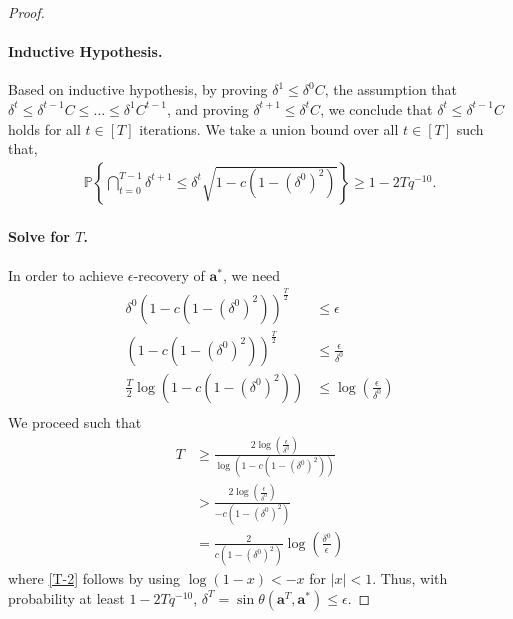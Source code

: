\documentclass{article}
\theoremstyle{plain}
\theoremstyle{definition}
\theoremstyle{remark}
\begin{document}
\begin{proof}
    
    
    \paragraph{Inductive Hypothesis.}
    Based on inductive hypothesis, by proving $\delta^{1}\leq \delta^{0} C$, the assumption that $\delta^{t}\leq \delta^{t-1} C\leq \dots \leq \delta^{1} C^{t-1}$, and proving $\delta^{t+1}\leq \delta^{t} C $, we conclude that $\delta^{t}\leq \delta^{t-1} C$ holds for all $t \in [T]$ iterations.
    We take a union bound over all $t \in [T]$ such that,
    \begin{align}
        \mathbb{P} \left\{\bigcap_{t=0}^{T-1} \delta^{t+1} \leq \delta^{t} \sqrt{1-c(1-(\delta^{0})^2)} \right\} \geq 1 - 2Tq^{-10}.  
    \end{align}
    \paragraph{Solve for $T$.}
    In order to achieve $\epsilon$-recovery of $\mathbf{a}^*$, we need
    \begin{align}
        \delta^{0} ({1-c(1-(\delta^{0})^2)})^{\frac{T}{2}} &\leq \epsilon \\
        ({1-c (1-(\delta^{0})^2)})^{\frac{T}{2}} &\leq \frac{\epsilon}{\delta^0} \\
        \frac{T}{2} \log{({1-c (1-(\delta^{0})^2)})} &\leq \log (\frac{\epsilon}{\delta^0})  \\
        \end{align} 
        We proceed such that
        \begin{align}
        T &\geq \frac{2\log (\frac{\epsilon}{\delta^0})}{\log{({1-c (1-(\delta^{0})^2)})}} \\
         &> \frac{2\log (\frac{\epsilon}{\delta^0})}{-c (1-(\delta^{0})^2)} \label{T-2}\\
         &= \frac{2}{c (1-(\delta^{0})^2)} \log(\frac{\delta^0}{\epsilon}) 
    \end{align} 
    where \eqref{T-2} follows by using $\log(1-x)<-x$ for $|x|<1$. Thus, with probability at least $1-2Tq^{-10}$, $\delta^T = \sin \theta ({\mathbf{a}^T},\mathbf{a}^*) \leq \epsilon$. 


\end{proof}
\end{document}
